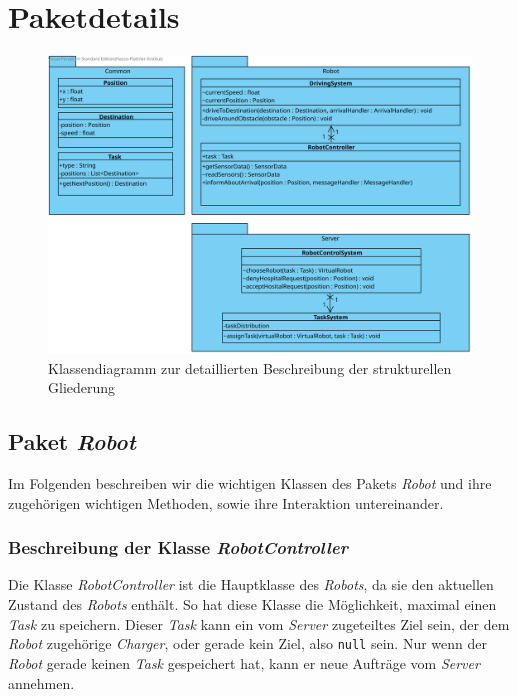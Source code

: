 \section{Paketdetails}
\begin{figure}[H]
\centering
\includegraphics[width=1\textwidth]{img/7-paketdetails}
\caption{Klassendiagramm zur detaillierten Beschreibung der strukturellen Gliederung}
\label{Paketdetails}
\end{figure}

\subsection{Paket \textit{Robot}}
	Im Folgenden beschreiben wir die wichtigen Klassen des Pakets \textit{Robot} 
	und ihre zugehörigen wichtigen Methoden, sowie ihre Interaktion untereinander. 


	\subsubsection{Beschreibung der Klasse \textit{RobotController}}
		
		Die Klasse \textit{RobotController} ist die Hauptklasse des \textit{Robots}, 
		da sie den aktuellen Zustand des \textit{Robots} enthält.
		So hat diese Klasse die Möglichkeit, maximal einen \textit{Task} zu speichern. 
		Dieser \textit{Task} kann ein vom \textit{Server} zugeteiltes Ziel sein, 
		der dem \textit{Robot} zugehörige \textit{Charger}, oder gerade kein Ziel, 
		also \texttt{null} sein. 
		Nur wenn der \textit{Robot} gerade keinen \textit{Task} 
		gespeichert hat, kann er neue Aufträge vom \textit{Server} annehmen.

